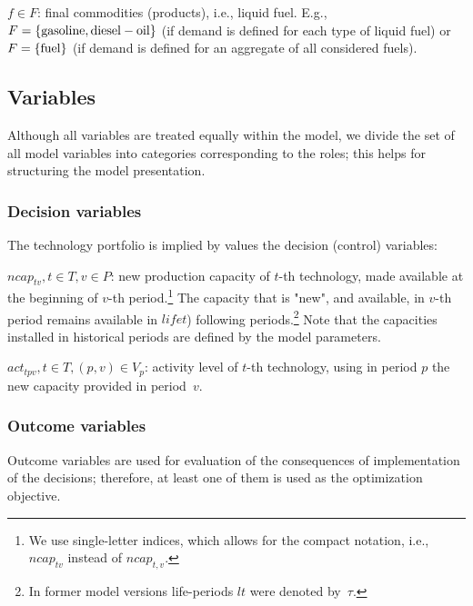 \documentclass[a4paper,12pt]{article}
\begin{document}
\item $f \in F$: final commodities (products), i.e., liquid fuel.
	E.g., $F = \{ {\rm gasoline, diesel-oil} \}$ (if demand is defined for each
	type of liquid fuel) or
	$F = \{ {\rm fuel} \}$ (if demand is defined for an aggregate of all
	considered fuels).
\begin{comment}
\item $c \in C$: commodity. E.g.,
	$C = \{ {\rm oil, gasoline, coal, crude-oil, \dots } \}$.
	Commodities belong to diverse subsets that correspond to their roles:
	\btlas{$\diamond$}
	\item $C_f \subset C$: final commodities (currently: gasoline and diesel-oil),
	\item $C_i \subset C$: commodities required as inputs for activities of
		technologies~$t \in T$,
	\item \dots  (more subsets shall be defined).
	\etls
\end{comment}
\etl

\subsection{Variables}
Although all variables are treated equally within the model,
we divide the set of all model variables into categories corresponding to the roles;
this helps for structuring the model presentation.

\subsubsection{Decision variables}
The technology portfolio is implied by values the decision (control) variables:
\btlb
\item $ncap_{tv}, t \in T, v \in P$: new production capacity of $t$-th
	technology, made available at the beginning of $v$-th period.\footnote{
	We use single-letter indices, which allows for the compact notation,
	i.e., $ncap_{tv}$ instead of $ncap_{t,v}$.}
	The capacity that is "new", and available, in $v$-th period
	remains available in $lifet$) following periods.\footnote{In former model
	versions life-periods $lt$ were denoted by~$\tau$.}
	Note that the capacities installed in historical periods are defined by
	the model parameters.
\item $act_{tpv}, t \in T, (p, v) \in V_p$: activity level of $t$-th
	technology, using in period $p$ the new capacity provided in period~$v$.
\etl

\subsubsection{Outcome variables}
Outcome variables are used for evaluation of the consequences of implementation
of the decisions; therefore, at least one of them is used as the optimization
objective.
\end{document}
